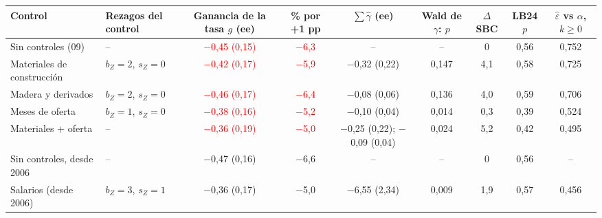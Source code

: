 \begin{tabular}{llccccccc}
\toprule
Control & Rezagos del control & Ganancia de la tasa $g$ (ee) & \% por +1 pp & $\sum\hat\gamma$ (ee) & Wald de $\gamma$: $p$ & $\Delta$SBC & LB24 $p$ & $\hat\varepsilon$ vs $\alpha$, $k\geq0$
\\ \midrule
Sin controles (09) & -- & \textcolor{red}{\ensuremath{-}0{,}45 (0{,}15)} & \textcolor{red}{\ensuremath{-}6{,}3} & -- & -- & 0 & 0{,}56 & 0{,}752 \\
Materiales de construcci\'on & $b_Z=2$, $s_Z=0$ & \textcolor{red}{\ensuremath{-}0{,}42 (0{,}17)} & \textcolor{red}{\ensuremath{-}5{,}9} & \ensuremath{-}0{,}32 (0{,}22) & 0{,}147 & 4{,}1 & 0{,}58 & 0{,}725 \\
Madera y derivados & $b_Z=2$, $s_Z=0$ & \textcolor{red}{\ensuremath{-}0{,}46 (0{,}17)} & \textcolor{red}{\ensuremath{-}6{,}4} & \ensuremath{-}0{,}08 (0{,}06) & 0{,}136 & 4{,}0 & 0{,}59 & 0{,}706 \\
Meses de oferta & $b_Z=1$, $s_Z=0$ & \textcolor{red}{\ensuremath{-}0{,}38 (0{,}16)} & \textcolor{red}{\ensuremath{-}5{,}2} & \ensuremath{-}0{,}10 (0{,}04) & 0{,}014 & 0{,}3 & 0{,}39 & 0{,}524 \\
Materiales + oferta & -- & \textcolor{red}{\ensuremath{-}0{,}36 (0{,}19)} & \textcolor{red}{\ensuremath{-}5{,}0} & \ensuremath{-}0{,}25 (0{,}22); \ensuremath{-}0{,}09 (0{,}04) & 0{,}024 & 5{,}2 & 0{,}42 & 0{,}495 \\
Sin controles, desde 2006 & -- & \ensuremath{-}0{,}47 (0{,}16) & \ensuremath{-}6{,}6 & -- & -- & 0 & 0{,}56 & -- \\
Salarios (desde 2006) & $b_Z=3$, $s_Z=1$ & \ensuremath{-}0{,}36 (0{,}17) & \ensuremath{-}5{,}0 & \ensuremath{-}6{,}55 (2{,}34) & 0{,}009 & 1{,}9 & 0{,}57 & 0{,}456 \\
\bottomrule
\end{tabular}
